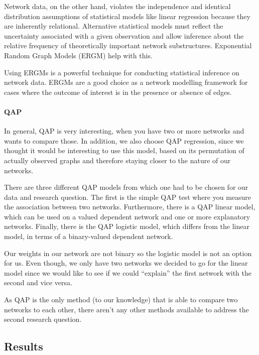 \documentclass[
  english,
  man,floatsintext]{apa6}
\let\oldparagraph\paragraph
\renewcommand{\paragraph}[1]{\oldparagraph{#1}\mbox{}}
\begin{document}
Network data, on the other hand, violates the independence and identical distribution assumptions of statistical models like linear regression because they are inherently relational. Alternative statistical models must reflect the uncertainty associated with a given observation and allow inference about the relative frequency of theoretically important network substructures. Exponential Random Graph Models (ERGM) help with this.

Using ERGMs is a powerful technique for conducting statistical inference on network data. ERGMs are a good choice as a network modelling framework for cases where the outcome of interest is in the presence or absence of edges.

\hypertarget{qap}{%
\paragraph{QAP}\label{qap}}

In general, QAP is very interesting, when you have two or more networks and wants to compare those. In addition, we also choose QAP regression, since we thought it would be interesting to use this model, based on its permutation of actually observed graphs and therefore staying closer to the nature of our networks.

There are three different QAP models from which one had to be chosen for our data and research question. The first is the simple QAP test where you measure the association between two networks. Furthermore, there is a QAP linear model, which can be used on a valued dependent network and one or more explanatory networks. Finally, there is the QAP logistic model, which differs from the linear model, in terms of a binary-valued dependent network.

Our weights in our network are not binary so the logistic model is not an option for us. Even though, we only have two networks we decided to go for the linear model since we would like to see if we could ``explain'' the first network with the second and vice versa.

As QAP is the only method (to our knowledge) that is able to compare two networks to each other, there aren't any other methods available to address the second research question.

\hypertarget{results}{%
\subsection{Results}\label{results}}
\end{document}
